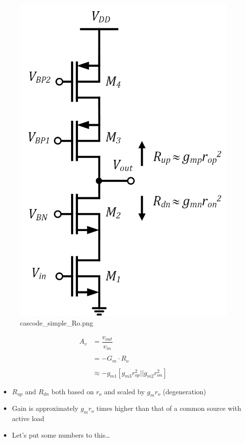 \documentclass[11pt]{article}
\providecommand{\tightlist}{%
      \setlength{\itemsep}{0pt}\setlength{\parskip}{0pt}}
\begin{document}
    \begin{figure}
\centering
\includegraphics{cascode_simple_Ro.png}
\caption{cascode\_simple\_Ro.png}
\end{figure}

    \begin{align}
A_v &= \dfrac{v_{out}}{v_{in}} \\
\\
&= -G_m\cdot R_o \\
\\
&\approx \boxed{-g_{m1}[g_{m3}r_{op}^2||g_{m2}r_{on}^2]}
\end{align}

    \begin{itemize}
\tightlist
\item
  \(R_{up}\) and \(R_{dn}\) both based on \(r_o\) and scaled by
  \(g_mr_o\) (degeneration)
\item
  Gain is approximately \(g_mr_o\) times higher than that of a common
  source with active load
\item
  Let's put some numbers to this\ldots{}
\end{itemize}
\end{document}

